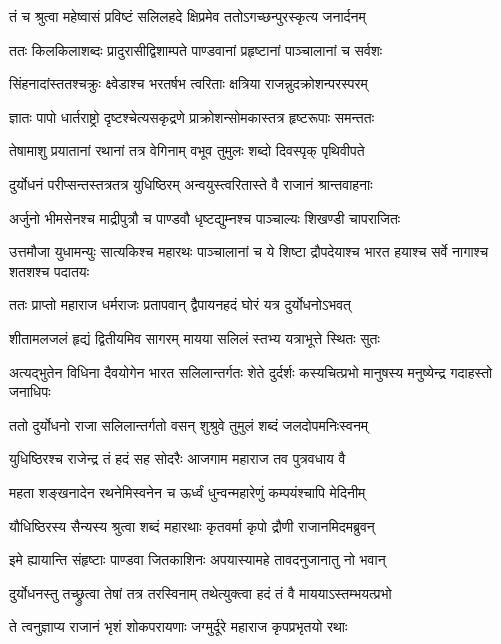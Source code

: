 \twolineshloka
{तं च श्रुत्वा महेष्वासं प्रविष्टं सलिलहदे}
{क्षिप्रमेव ततोऽगच्छन्पुरस्कृत्य जनार्दनम्}


\twolineshloka
{ततः किलकिलाशब्दः प्रादुरासीद्विशाम्पते}
{पाण्डवानां प्रहृष्टानां पाञ्चालानां च सर्वशः}


\twolineshloka
{सिंहनादांस्ततश्चक्रुः क्ष्वेडाश्च भरतर्षभ}
{त्वरिताः क्षत्रिया राजन्नुदक्रोशन्परस्परम्}


\twolineshloka
{ज्ञातः पापो धार्तराष्ट्रो दृष्टश्चेत्यसकृद्रणे}
{प्राक्रोशन्सोमकास्तत्र हृष्टरूपाः समन्ततः}


\twolineshloka
{तेषामाशु प्रयातानां रथानां तत्र वेगिनाम्}
{वभूव तुमुलः शब्दो दिवस्पृक् पृथिवीपते}


\twolineshloka
{दुर्योधनं परीप्सन्तस्तत्रतत्र युधिष्ठिरम्}
{अन्वयुस्त्वरितास्ते वै राजानं श्रान्तवाहनाः}


\twolineshloka
{अर्जुनो भीमसेनश्च माद्रीपुत्रौ च पाण्डवौ}
{धृष्टद्युम्नश्च पाञ्चाल्यः शिखण्डी चापराजितः}


\threelineshloka
{उत्तमौजा युधामन्युः सात्यकिश्च महारथः}
{पाञ्चालानां च ये शिष्टा द्रौपदेयाश्च भारत}
{हयाश्च सर्वे नागाश्च शतशश्च पदातयः}


\twolineshloka
{ततः प्राप्तो महाराज धर्मराजः प्रतापवान्}
{द्वैपायनहदं घोरं यत्र दुर्योधनोऽभवत्}


\twolineshloka
{शीतामलजलं हृद्यं द्वितीयमिव सागरम्}
{मायया सलिलं स्तभ्य यत्राभूत्ते स्थितः सुतः}


\threelineshloka
{अत्यद्भुतेन विधिना दैवयोगेन भारत}
{सलिलान्तर्गतः शेते दुर्दर्शः कस्यचित्प्रभो}
{मानुषस्य मनुष्येन्द्र गदाहस्तो जनाधिपः}


\twolineshloka
{ततो दुर्योधनो राजा सलिलान्तर्गतो वसन्}
{शुश्रुवे तुमुलं शब्दं जलदोपमनिःस्वनम्}


\twolineshloka
{युधिष्ठिरश्च राजेन्द्र तं हदं सह सोदरैः}
{आजगाम महाराज तव पुत्रवधाय वै}


\twolineshloka
{महता शङ्खनादेन रथनेमिस्वनेन च}
{ऊर्ध्वं धुन्वन्महारेणुं कम्पयंश्चापि मेदिनीम्}


\twolineshloka
{यौधिष्ठिरस्य सैन्यस्य श्रुत्वा शब्दं महारथाः}
{कृतवर्मा कृपो द्रौणी राजानमिदमब्रुवन्}


\twolineshloka
{इमे ह्यायान्ति संहृष्टाः पाण्डवा जितकाशिनः}
{अपयास्यामहे तावदनुजानातु नो भवान्}


\twolineshloka
{दुर्योधनस्तु तच्छ्रुत्वा तेषां तत्र तरस्विनाम्}
{तथेत्युक्त्वा हदं तं वै माययाऽस्तम्भयत्प्रभो}


\twolineshloka
{ते त्वनुज्ञाप्य राजानं भृशं शोकपरायणाः}
{जग्मुर्दूरे महाराज कृपप्रभृतयो रथाः}


